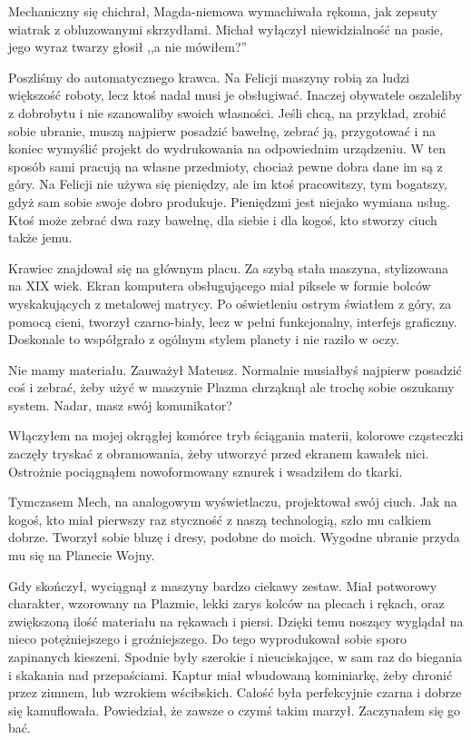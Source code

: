 Mechaniczny się chichrał, Magda-niemowa wymachiwała rękoma, jak zepsuty wiatrak z obluzowanymi skrzydłami. Michał wyłączył niewidzialność na pasie, jego wyraz twarzy głosił ,,a nie mówiłem?''

Poszliśmy do automatycznego krawca.
Na Felicji maszyny robią za ludzi większość roboty, lecz ktoś nadal musi je obsługiwać. 
Inaczej obywatele oszaleliby z dobrobytu i nie szanowaliby swoich własności.
Jeśli chcą, na przykład, zrobić sobie ubranie, muszą najpierw posadzić bawełnę, zebrać ją, przygotować i na koniec wymyślić projekt do wydrukowania na odpowiednim urządzeniu.
W ten sposób sami pracują na własne przedmioty, chociaż pewne dobra dane im są z góry.
Na Felicji nie używa się pieniędzy, ale im ktoś pracowitszy, tym bogatszy, gdyż sam sobie swoje dobro produkuje.
Pieniędzmi jest niejako wymiana usług. Ktoś może zebrać dwa razy bawełnę, dla siebie i dla kogoś, kto stworzy ciuch także jemu.

Krawiec znajdował się na głównym placu.
Za szybą stała maszyna, stylizowana na XIX wiek. 
Ekran komputera obsługującego miał piksele w formie bolców wyskakujących z metalowej matrycy. 
Po oświetleniu ostrym światłem z góry, za pomocą cieni, tworzył czarno-biały, lecz w pełni funkcjonalny, interfejs graficzny.
Doskonale to współgrało z ogólnym stylem planety i nie raziło w oczy.

\begin{dialogue}
\ds{} Nie mamy materiału. \dm{} Zauważył Mateusz.
\ds{} Normalnie musiałbyś najpierw posadzić coś i zebrać, żeby użyć w maszynie \dm{} Plazma chrząknął \dm{} ale trochę sobie oszukamy system.
Nadar, masz swój komunikator?
\end{dialogue}

Włączyłem na mojej okrągłej komórce tryb ściągania materii, kolorowe cząsteczki zaczęły tryskać z obramowania, żeby utworzyć przed ekranem kawałek nici.
Ostrożnie pociągnąłem nowoformowany sznurek i wsadziłem do tkarki. 

Tymczasem Mech, na analogowym wyświetlaczu, projektował swój ciuch. 
Jak na kogoś, kto miał pierwszy raz styczność z naszą technologią, szło mu całkiem dobrze.
Tworzył sobie bluzę i dresy, podobne do moich. Wygodne ubranie przyda mu się na Planecie Wojny.

Gdy skończył, wyciągnął z maszyny bardzo ciekawy zestaw. Miał potworowy charakter, wzorowany na Plazmie, lekki zarys kolców na plecach i rękach, oraz zwiększoną ilość materiału na rękawach i piersi.
Dzięki temu noszący wyglądał na nieco potężniejszego i groźniejszego.
Do tego wyprodukował sobie sporo zapinanych kieszeni. 
Spodnie były szerokie i nieuciskające, w sam raz do biegania i skakania nad przepaściami.
Kaptur miał wbudowaną kominiarkę, żeby chronić przez zimnem, lub wzrokiem wścibskich.
Całość była perfekcyjnie czarna i dobrze się kamuflowała.
Powiedział, że zawsze o czymś takim marzył.
Zaczynałem się go bać.

